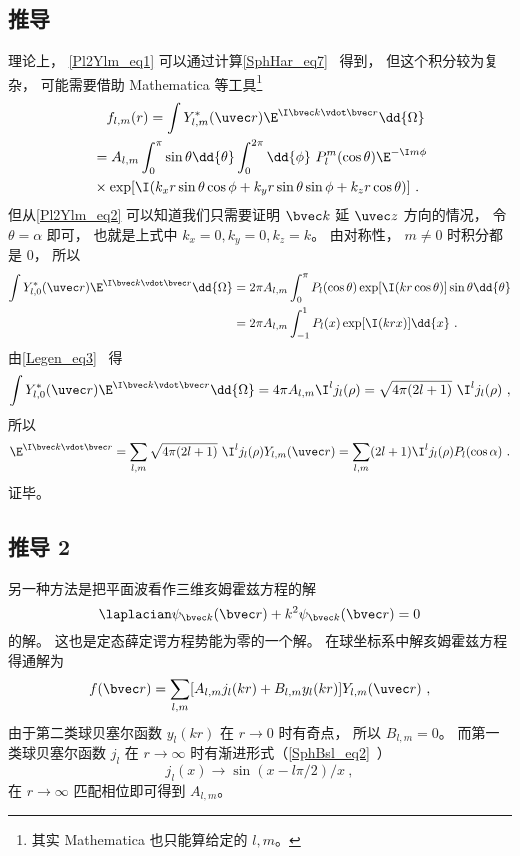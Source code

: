 \subsection{推导}
理论上， \autoref{Pl2Ylm_eq1} 可以通过计算\autoref{SphHar_eq7}~ 得到， 但这个积分较为复杂， 可能需要借助 Mathematica 等工具\footnote{其实 Mathematica 也只能算给定的 $l, m$。}
\begin{equation}
\begin{aligned}
&\quad f_{l,m}(r) = \int Y_{l,m}^*(\uvec r)\E^{\I \bvec k \vdot \bvec r} \dd{\Omega}\\
&= A_{l,m}\int_0^\pi \sin\theta\dd{\theta} \int_0^{2\pi} \dd{\phi} \,\,P_l^m(\cos\theta) \E^{-\I m \phi}\\
&\times \exp[\I (k_x r \sin\theta\cos\phi + k_y r \sin\theta\sin\phi + k_z r \cos\theta)]~.
\end{aligned}
\end{equation}
但从\autoref{Pl2Ylm_eq2} 可以知道我们只需要证明 $\bvec k$ 延 $\uvec z$ 方向的情况， 令 $\theta = \alpha$ 即可， 也就是上式中 $k_x = 0, k_y = 0, k_z = k$。 由对称性， $m \ne 0$ 时积分都是 0， 所以
\begin{equation}
\begin{aligned}
\int Y_{l,0}^*(\uvec r)\E^{\I \bvec k \vdot \bvec r} \dd{\Omega}
&= 2\pi A_{l,m}\int_0^\pi P_l(\cos\theta) \exp[\I (k r \cos\theta)] \sin\theta\dd{\theta}\\
&= 2\pi A_{l,m}\int_{-1}^1 P_l(x) \exp[\I (k r x)] \dd{x}~.
\end{aligned}
\end{equation}
由\autoref{Legen_eq3}~ 得
\begin{equation}
\int Y_{l,0}^*(\uvec r)\E^{\I \bvec k \vdot \bvec r} \dd{\Omega}
= 4\pi A_{l,m} \I^l j_l(\rho)
= \sqrt{4\pi (2l + 1)}\ \I^l j_l(\rho)~,
\end{equation}
所以
\begin{equation}
\E^{\I \bvec k \vdot \bvec r} = \sum_{l,m} \sqrt{4\pi (2l + 1)}\ \I^l j_l(\rho) Y_{l,m}(\uvec r)
=\sum_{l,m} (2l + 1) \I^l j_l(\rho) P_l(\cos\alpha)~.
\end{equation}
证毕。

\subsection{推导 2}
另一种方法是把平面波看作三维亥姆霍兹方程的解
\begin{equation}
\laplacian \psi_{\bvec k}(\bvec r) + k^2 \psi_{\bvec k}(\bvec r) = 0
\end{equation}
的解。 这也是定态薛定谔方程势能为零的一个解。 在球坐标系中解亥姆霍兹方程 得通解为
\begin{equation}
f(\bvec r) = \sum_{l,m} [A_{l,m} j_l(kr) + B_{l,m} y_l(kr)] Y_{l,m}(\uvec r)~,
\end{equation}
由于第二类球贝塞尔函数 $y_l(kr)$ 在 $r\to 0$ 时有奇点， 所以 $B_{l,m} = 0$。 而第一类球贝塞尔函数 $j_l$ 在 $r\to \infty$ 时有渐进形式（\autoref{SphBsl_eq2}~）
\begin{equation}
j_l(x) \to \sin(x - l\pi /2)/x~,
\end{equation}
在 $r\to \infty$ 匹配相位即可得到 $A_{l,m}$。
